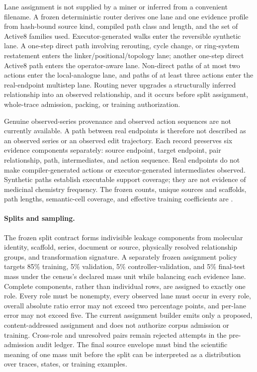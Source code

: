Lane assignment is not supplied by a miner or inferred from a convenient
filename. A frozen deterministic router derives one lane and one evidence
profile from hash-bound source kind, compiled path class and length, and the
set of Active8 families used. Executor-generated walks enter the reversible
synthetic lane. A one-step direct path involving rerouting, cycle change, or
ring-system restatement enters the linker/positional/topology lane; another
one-step direct Active8 path enters the operator-aware lane. Non-direct paths
of at most two actions enter the local-analogue lane, and paths of at least
three actions enter the real-endpoint multistep lane. Routing never upgrades a
structurally inferred relationship into an observed relationship, and it
occurs before split assignment, whole-trace admission, packing, or training
authorization.

Genuine observed-series provenance and observed action sequences are not
currently available. A path between real endpoints is therefore not described
as an observed series or an observed edit trajectory. Each record preserves
six evidence components separately: source endpoint, target endpoint, pair
relationship, path, intermediates, and action sequence. Real endpoints do not
make compiler-generated actions or executor-generated intermediates observed.
Synthetic paths establish executable support coverage; they are not evidence
of medicinal chemistry frequency. The frozen counts, unique sources and
scaffolds, path lengths, semantic-cell coverage, and effective training
coefficients are .

\paragraph{Splits and sampling.}
The frozen split contract forms indivisible leakage components from molecular
identity, scaffold, series, document or source, physically resolved
relationship groups, and transformation signature. A separately frozen
assignment policy targets 85\% training, 5\% validation, 5\%
controller-validation, and 5\% final-test mass under the census's declared mass
unit while balancing each evidence lane. Complete components, rather than
individual rows, are assigned to exactly one role. Every role must be
nonempty, every observed lane must occur in every role, overall absolute ratio
error may not exceed two percentage points, and per-lane error may not exceed
five. The current assignment builder emits only a proposed,
content-addressed assignment and does not authorize corpus admission or
training. Cross-role and unresolved pairs remain rejected attempts in the
pre-admission audit ledger. The final source envelope must bind the scientific
meaning of one mass unit before the split can be interpreted as a distribution
over traces, states, or training examples.


